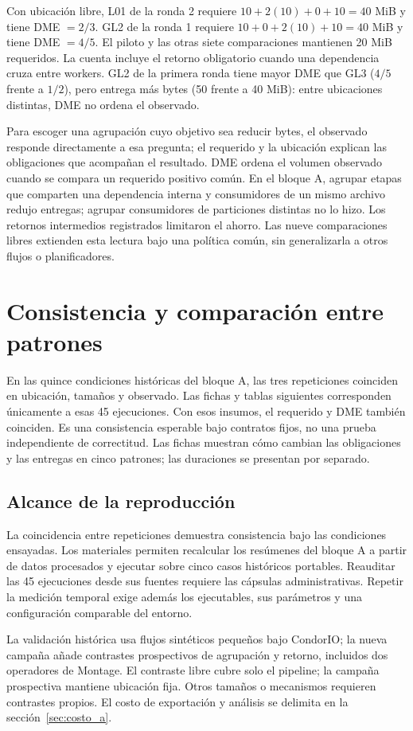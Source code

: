 Con ubicación libre, L01 de la ronda 2 requiere $10+2(10)+0+10=40$ MiB y tiene DME $=2/3$. GL2 de la ronda 1 requiere $10+0+2(10)+10=40$ MiB y tiene DME $=4/5$. El piloto y las otras siete comparaciones mantienen 20 MiB requeridos. La cuenta incluye el retorno obligatorio cuando una dependencia cruza entre workers. GL2 de la primera ronda tiene mayor DME que GL3 ($4/5$ frente a $1/2$), pero entrega más bytes (50 frente a 40 MiB): entre ubicaciones distintas, DME no ordena el observado.

Para escoger una agrupación cuyo objetivo sea reducir bytes, el observado responde directamente a esa pregunta; el requerido y la ubicación explican las obligaciones que acompañan el resultado. DME ordena el volumen observado cuando se compara un requerido positivo común. En el bloque A, agrupar etapas que comparten una dependencia interna y consumidores de un mismo archivo redujo entregas; agrupar consumidores de particiones distintas no lo hizo. Los retornos intermedios registrados limitaron el ahorro. Las nueve comparaciones libres extienden esta lectura bajo una política común, sin generalizarla a otros flujos o planificadores.

\section{Consistencia y comparación entre patrones}
\label{sec:repro_patrones}
En las quince condiciones históricas del bloque A, las tres repeticiones coinciden en ubicación, tamaños y observado. Las fichas y tablas siguientes corresponden únicamente a esas 45 ejecuciones. Con esos insumos, el requerido y DME también coinciden. Es una consistencia esperable bajo contratos fijos, no una prueba independiente de correctitud. Las fichas muestran cómo cambian las obligaciones y las entregas en cinco patrones; las duraciones se presentan por separado.







\subsection{Alcance de la reproducción}
La coincidencia entre repeticiones demuestra consistencia bajo las condiciones ensayadas. Los materiales permiten recalcular los resúmenes del bloque A a partir de datos procesados y ejecutar \Analyzer{} sobre cinco casos históricos portables. Reauditar las 45 ejecuciones desde sus fuentes requiere las cápsulas administrativas. Repetir la medición temporal exige además los ejecutables, sus parámetros y una configuración comparable del entorno.

La validación histórica usa flujos sintéticos pequeños bajo CondorIO; la nueva campaña añade contrastes prospectivos de agrupación y retorno, incluidos dos operadores de Montage. El contraste libre cubre solo el pipeline; la campaña prospectiva mantiene ubicación fija. Otros tamaños o mecanismos requieren contrastes propios. El costo de exportación y análisis se delimita en la sección~\ref{sec:costo_a}.
